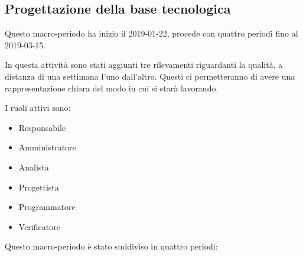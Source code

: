 		\newpage

        \subsection{Progettazione della base tecnologica}\label{PianificazioneBaseTecnologica}
		Questo macro-periodo ha inizio il 2019-01-22, procede con quattro periodi fino al 2019-03-15.

		In questa attività sono stati aggiunti tre rilevamenti riguardanti la qualità, a distanza di una settimana l'uno
		dall'altro. Questi ci permetteranno di avere una rappresentazione chiara del modo in cui si starà lavorando.

        I ruoli attivi sono:
        \begin{itemize}
            \item Responsabile
            \item Amministratore
            \item Analista
            \item Progettista
            \item Programmatore
            \item Verificatore
        \end{itemize}
        Questo macro-periodo è stato suddiviso in quattro periodi:
